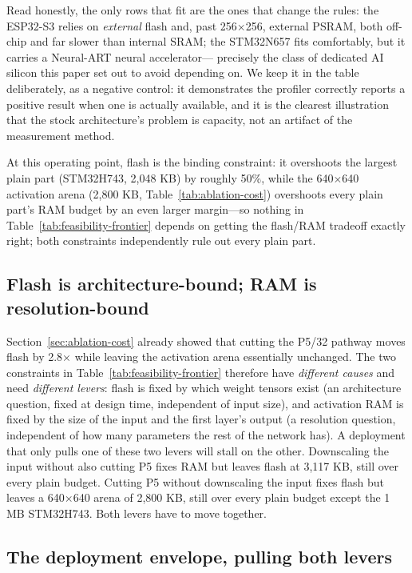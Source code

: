 \documentclass[11pt]{article}
\begin{document}
Read honestly, the only rows that fit are the ones that change the rules:
the ESP32-S3 relies on \emph{external} flash and, past 256$\times$256,
external PSRAM, both off-chip and far slower than internal SRAM; the
STM32N657 fits comfortably, but it carries a Neural-ART neural accelerator---
precisely the class of dedicated AI silicon this paper set out to avoid
depending on. We keep it in the table deliberately, as a negative control:
it demonstrates the profiler correctly reports a positive result when one is
actually available, and it is the clearest illustration that the stock
architecture's problem is capacity, not an artifact of the measurement
method.

At this operating point, flash is the binding constraint: it overshoots the
largest plain part (STM32H743, 2,048 KB) by roughly 50\%, while the
640$\times$640 activation arena (2,800 KB, Table~\ref{tab:ablation-cost})
overshoots every plain part's RAM budget by an even larger margin---so
nothing in Table~\ref{tab:feasibility-frontier} depends on getting the
flash/RAM tradeoff exactly right; both constraints independently rule out
every plain part.

\subsection{Flash is architecture-bound; RAM is resolution-bound}

Section~\ref{sec:ablation-cost} already showed that cutting the P5/32
pathway moves flash by 2.8$\times$ while leaving the activation arena
essentially unchanged. The two constraints in
Table~\ref{tab:feasibility-frontier} therefore have \emph{different causes}
and need \emph{different levers}: flash is fixed by which weight tensors
exist (an architecture question, fixed at design time, independent of input
size), and activation RAM is fixed by the size of the input and the first
layer's output (a resolution question, independent of how many parameters
the rest of the network has). A deployment that only pulls one of these two
levers will stall on the other. Downscaling the input without also cutting
P5 fixes RAM but leaves flash at 3,117 KB, still over every plain budget.
Cutting P5 without downscaling the input fixes flash but leaves a
640$\times$640 arena of 2,800 KB, still over every plain budget except the
1 MB STM32H743. Both levers have to move together.

\subsection{The deployment envelope, pulling both levers}
\label{sec:deployment-envelope}
\end{document}
